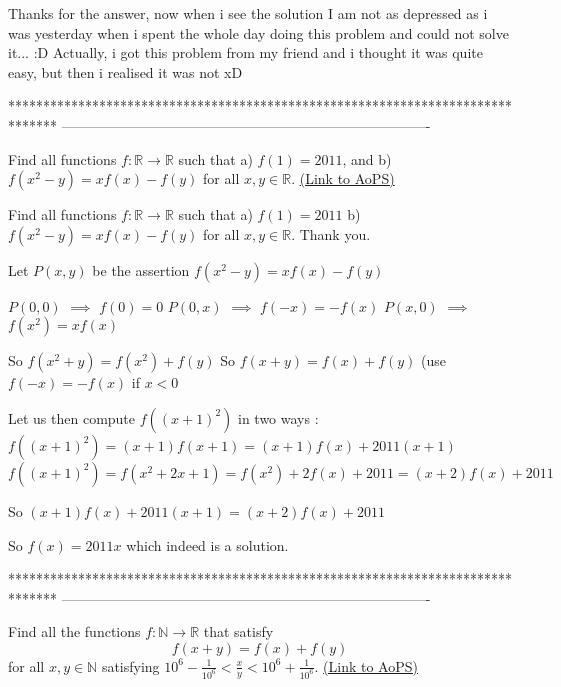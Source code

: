 \begin{solution}
	Thanks for the answer, now when i see the solution I am not as depressed as i was yesterday when i spent the whole day doing this problem and could not solve it... :D Actually, i got this problem from my friend and i thought it was quite easy, but then i realised it was not xD
\end{solution}
*******************************************************************************
-------------------------------------------------------------------------------

\begin{problem}
	Find all functions $f:\mathbb{R}\to\mathbb{R}$ such that
a) $f(1)=2011$, and
b) $f(x^2-y)=xf(x)-f(y)$ for all $x,y\in\mathbb{R}$.
	\flushright \href{https://artofproblemsolving.com/community/c6h448262}{(Link to AoPS)}
\end{problem}



\begin{solution}
	\begin{tcolorbox}Find all functions $f:\mathbb{R}\to\mathbb{R}$ such that
a) $f(1)=2011$
b) $f(x^2-y)=xf(x)-f(y)$ for all $x,y\in\mathbb{R}$.
Thank you.\end{tcolorbox}
Let $P(x,y)$ be the assertion $f(x^2-y)=xf(x)-f(y)$

$P(0,0)$ $\implies$ $f(0)=0$
$P(0,x)$ $\implies$ $f(-x)=-f(x)$
$P(x,0)$ $\implies$ $f(x^2)=xf(x)$

So $f(x^2+y)=f(x^2)+f(y)$
So $f(x+y)=f(x)+f(y)$ (use $f(-x)=-f(x)$ if $x<0$

Let us then compute $f((x+1)^2)$ in two ways :
$f((x+1)^2)=(x+1)f(x+1)=(x+1)f(x)+2011(x+1)$
$f((x+1)^2)=f(x^2+2x+1)=f(x^2)+2f(x)+2011=(x+2)f(x)+2011$

So $(x+1)f(x)+2011(x+1)=(x+2)f(x)+2011$

So $\boxed{f(x)=2011x}$ which indeed is a solution.
\end{solution}
*******************************************************************************
-------------------------------------------------------------------------------

\begin{problem}
	Find all the functions $f:\mathbb{N}\to\mathbb{R}$ that satisfy
\[ f(x+y)=f(x)+f(y) \] for all $x,y\in\mathbb{N}$ satisfying $10^6-\frac{1}{10^6} < \frac{x}{y} < 10^6+\frac{1}{10^6}$.
	\flushright \href{https://artofproblemsolving.com/community/c6h448277}{(Link to AoPS)}
\end{problem}



